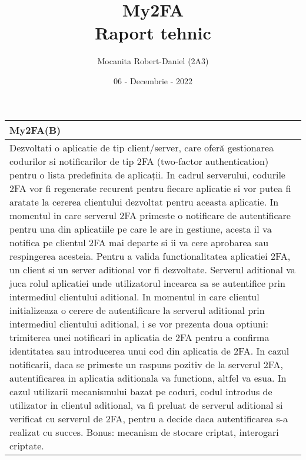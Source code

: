 \documentclass{article}
\begin{document}
	\title{
	My2FA\\
	Raport tehnic\\
	}
	\author{Mocanita Robert-Daniel (2A3)}
	
	\date{06 - Decembrie - 2022}
	
	\maketitle
	
	\begin{tabularx}{1\textwidth} {|X|}
		\hline
		\large
		\textsf{My2FA(B)}\\
		\hline
		\cellcolor{orange_proj}
		\textsf{Dezvoltati o aplicatie de tip client/server, care oferă gestionarea codurilor si notificarilor de tip 2FA (two-factor authentication) pentru o lista predefinita de aplicații. In cadrul serverului, codurile 2FA vor fi regenerate recurent pentru fiecare aplicatie si vor putea fi aratate la cererea clientului dezvoltat pentru aceasta aplicatie. In momentul in care serverul 2FA primeste o notificare de autentificare pentru una din aplicatiile pe care le are in gestiune, acesta il va notifica pe clientul 2FA mai departe si ii va cere aprobarea sau respingerea acesteia. Pentru a valida functionalitatea aplicatiei 2FA, un client si un server aditional vor fi dezvoltate. Serverul aditional va juca rolul aplicatiei unde utilizatorul incearca sa se autentifice prin intermediul clientului aditional. In momentul in care clientul initializeaza o cerere de autentificare la serverul aditional prin intermediul clientului aditional, i se vor prezenta doua optiuni: trimiterea unei notificari in aplicatia de 2FA pentru a confirma identitatea sau introducerea unui cod din aplicatia de 2FA. In cazul notificarii, daca se primeste un raspuns pozitiv de la serverul 2FA, autentificarea in aplicatia aditionala va functiona, altfel va esua. In cazul utilizarii mecanismului bazat pe coduri, codul introdus de utilizator in clientul aditional, va fi preluat de serverul aditional si verificat cu serverul de 2FA, pentru a decide daca autentificarea s-a realizat cu succes. Bonus: mecanism de stocare criptat, interogari criptate. }
		\\
		\hline
	\end{tabularx}
\end{document}
